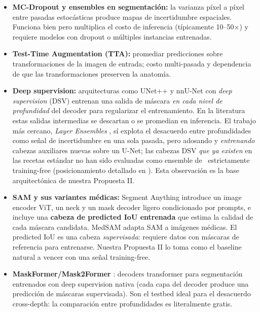 \documentclass[12pt,a4paper]{article}
\newcommand{\UQ}{\text{UQ}}
\begin{document}
\begin{itemize}[leftmargin=2em]
    \item \textbf{MC-Dropout y ensembles en segmentación:} la varianza píxel a píxel entre pasadas estocásticas produce mapas de incertidumbre espaciales.
    Funciona bien pero multiplica el costo de inferencia (típicamente 10--50$\times$) y requiere modelos con dropout o múltiples instancias entrenadas.

    \item \textbf{Test-Time Augmentation (TTA):} promediar predicciones sobre transformaciones de la imagen de entrada; costo multi-pasada y dependencia de que las transformaciones preserven la anatomía.

    \item \textbf{Deep supervision:} arquitecturas como UNet++ \citep{zhou2020unetpp} y nnU-Net con \textit{deep supervision} (DSV) \citep{isensee2021nnunet} entrenan una salida de máscara \emph{en cada nivel de profundidad} del decoder para regularizar el entrenamiento.
    En la literatura estas salidas intermedias se descartan o se promedian en inferencia.
    El trabajo más cercano, \textit{Layer Ensembles} \citep{kushibar2022layer}, sí explota el desacuerdo entre profundidades como señal de incertidumbre en una sola pasada, pero adosando y \emph{entrenando} cabezas auxiliares nuevas sobre un U-Net; las cabezas DSV \emph{que ya existen} en las recetas estándar no han sido evaluadas como ensemble de \UQ\ estrictamente training-free (posicionamiento detallado en ).
    Esta observación es la base arquitectónica de nuestra Propuesta II.

    \item \textbf{SAM y sus variantes médicas:} Segment Anything \citep{kirillov2023sam} introduce un image encoder ViT, un neck y un mask decoder ligero condicionado por prompts, e incluye una \textbf{cabeza de predicted IoU entrenada} que estima la calidad de cada máscara candidata.
    MedSAM \citep{ma2024medsam} adapta SAM a imágenes médicas.
    El predicted IoU es una cabeza \emph{supervisada}: requiere datos con máscaras de referencia para entrenarse.
    Nuestra Propuesta II lo toma como el baseline natural a vencer con una señal training-free.

    \item \textbf{MaskFormer/Mask2Former} \citep{cheng2022mask2former}: decoders transformer para segmentación entrenados con deep supervision nativa (cada capa del decoder produce una predicción de máscaras supervisada).
    Son el testbed ideal para el desacuerdo cross-depth: la comparación entre profundidades es literalmente gratis.
\end{itemize}
\end{document}
